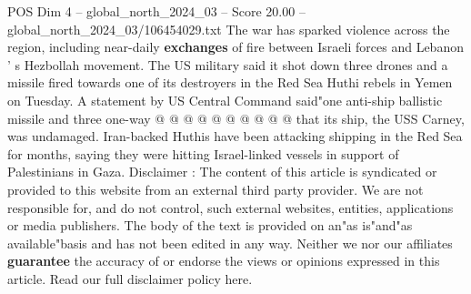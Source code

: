 \begin{textsample}{POS Dim 4 – global\_north\_2024\_03 – Score 20.00 – global\_north\_2024\_03/106454029.txt}
The war has sparked violence across the region, including near-daily \textbf{exchanges} of fire between Israeli forces and Lebanon ' s Hezbollah movement.
The US military said it shot down three drones and a missile fired towards one of its destroyers in the Red Sea Huthi rebels in Yemen on Tuesday.
A statement by US Central Command said"one anti-ship ballistic missile and three one-way @ @ @ @ @ @ @ @ @ @ that its ship, the USS Carney, was undamaged.
Iran-backed Huthis have been attacking shipping in the Red Sea for months, saying they were hitting Israel-linked vessels in support of Palestinians in Gaza.
Disclaimer : The content of this article is syndicated or provided to this website from an external third party provider.
We are not responsible for, and do not control, such external websites, entities, applications or media publishers.
The body of the text is provided on an"as is"and"as available"basis and has not been edited in any way.
Neither we nor our affiliates \textbf{guarantee} the accuracy of or endorse the views or opinions expressed in this article.
Read our full disclaimer policy here.

\end{textsample}
